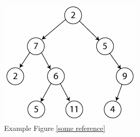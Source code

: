 \begin{figure}[placement h]
  \begin{center}
      \includegraphics[scale=0.50]{binary_tree.png}
      \caption{Example Figure \ref{some reference}}
      \label{fig:example topic}
   \end{center}
\end{figure}